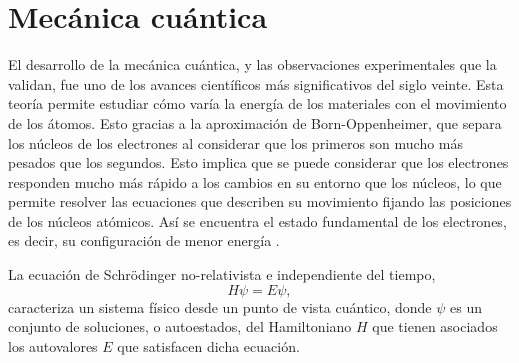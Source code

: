 \section{Mecánica cuántica}

El desarrollo de la mecánica cuántica, y las observaciones experimentales que la
validan, fue uno de los avances científicos más significativos del siglo veinte. 
Esta teoría permite estudiar cómo varía la energía de los materiales con el 
movimiento de los átomos. Esto gracias a la aproximación de Born-Oppenheimer, que 
separa los núcleos de los electrones al considerar que los primeros son mucho más
pesados que los segundos. Esto implica que se puede considerar que los electrones 
responden mucho más rápido a los cambios en su entorno que los núcleos, lo que 
permite resolver las ecuaciones que describen su movimiento fijando las 
posiciones de los núcleos atómicos. Así se encuentra el estado fundamental de los
electrones, es decir, su configuración de menor energía \cite{shankar2012}.

La ecuación de Schrödinger no-relativista e independiente del tiempo,
\begin{equation}\label{eq:schrodinger}
    H \psi = E \psi,
\end{equation}
caracteriza un sistema físico desde un punto de vista cuántico, donde $\psi$ es un
conjunto de soluciones, o autoestados, del Hamiltoniano $H$ que tienen asociados los
autovalores $E$ que satisfacen dicha ecuación. 

